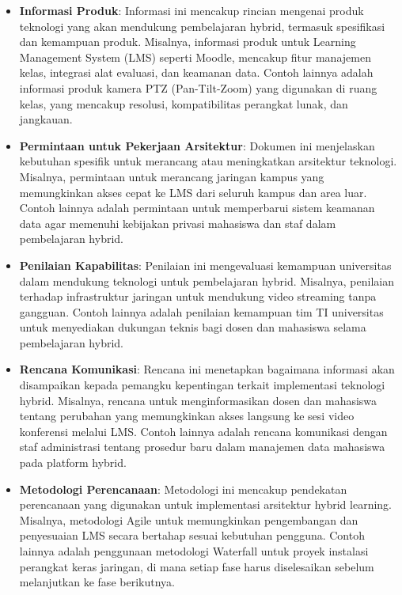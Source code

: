 \begin{itemize}
	\item \textbf{Informasi Produk}: Informasi ini mencakup rincian mengenai produk teknologi yang akan mendukung pembelajaran hybrid, termasuk spesifikasi dan kemampuan produk. Misalnya, informasi produk untuk Learning Management System (LMS) seperti Moodle, mencakup fitur manajemen kelas, integrasi alat evaluasi, dan keamanan data. Contoh lainnya adalah informasi produk kamera PTZ (Pan-Tilt-Zoom) yang digunakan di ruang kelas, yang mencakup resolusi, kompatibilitas perangkat lunak, dan jangkauan.
	
	\item \textbf{Permintaan untuk Pekerjaan Arsitektur}: Dokumen ini menjelaskan kebutuhan spesifik untuk merancang atau meningkatkan arsitektur teknologi. Misalnya, permintaan untuk merancang jaringan kampus yang memungkinkan akses cepat ke LMS dari seluruh kampus dan area luar. Contoh lainnya adalah permintaan untuk memperbarui sistem keamanan data agar memenuhi kebijakan privasi mahasiswa dan staf dalam pembelajaran hybrid.
	
	\item \textbf{Penilaian Kapabilitas}: Penilaian ini mengevaluasi kemampuan universitas dalam mendukung teknologi untuk pembelajaran hybrid. Misalnya, penilaian terhadap infrastruktur jaringan untuk mendukung video streaming tanpa gangguan. Contoh lainnya adalah penilaian kemampuan tim TI universitas untuk menyediakan dukungan teknis bagi dosen dan mahasiswa selama pembelajaran hybrid.
	
	\item \textbf{Rencana Komunikasi}: Rencana ini menetapkan bagaimana informasi akan disampaikan kepada pemangku kepentingan terkait implementasi teknologi hybrid. Misalnya, rencana untuk menginformasikan dosen dan mahasiswa tentang perubahan yang memungkinkan akses langsung ke sesi video konferensi melalui LMS. Contoh lainnya adalah rencana komunikasi dengan staf administrasi tentang prosedur baru dalam manajemen data mahasiswa pada platform hybrid.
	
	\item \textbf{Metodologi Perencanaan}: Metodologi ini mencakup pendekatan perencanaan yang digunakan untuk implementasi arsitektur hybrid learning. Misalnya, metodologi Agile untuk memungkinkan pengembangan dan penyesuaian LMS secara bertahap sesuai kebutuhan pengguna. Contoh lainnya adalah penggunaan metodologi Waterfall untuk proyek instalasi perangkat keras jaringan, di mana setiap fase harus diselesaikan sebelum melanjutkan ke fase berikutnya.
	

\end{itemize}
